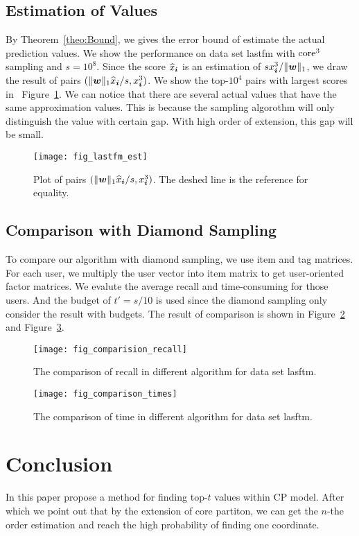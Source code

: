 \documentclass[letterpaper]{article}
\newcommand{\V}[1]{{\boldsymbol{{\MakeLowercase{#1}}}}}
\newcommand{\norm}[2]{\|#1\|_{#2}}
\newcommand{\Fig}[1]   {Figure~\ref{fig:#1}}
\newcommand{\Theo}[1] {Theorem~\ref{theo:#1}}
\begin{document}
\subsection{Estimation of Values}
By \Theo{Bound}, we gives the error bound of estimate the actual prediction values.
We show the performance on data set lastfm with ${\rm core}^3$ sampling and $s=10^8$.
Since the score $\widehat{x}_{\V{i}}$ is an estimation of $sx^3_{\V{i}}/\norm{\V{w}}{1}$,
we draw the result of pairs $(\norm{\V{w}}{1}\widehat{x}_{\V{i}}/s,x^3_{\V{i}})$.
We show the top-$10^4$ pairs with largest scores in ~\Fig{Est}.
We can notice that there are several actual values that have the same approximation values.
This is because the sampling algorothm will only distinguish the value with certain gap.
With high order of extension, this gap will be small. 
\begin{figure}[ht]
  \centering
  \texttt{[image: fig\_lastfm\_est]}\\
  \caption{Plot of pairs $(\norm{\V{w}}{1}\widehat{x}_{\V{i}}/s,x^3_{\V{i}})$.
          The deshed line is the reference for equality.}
  \label{fig:Est}
\end{figure}
\subsection{Comparison with Diamond Sampling}
To compare our algorithm with diamond sampling, we use item and tag matrices.
For each user, we multiply the user vector into item matrix
to get user-oriented factor matrices.
We evalute the average recall and time-consuming for those users.
And the budget of $t'=s/10$ is used since the diamond sampling only consider the result with budgets.
The result of comparison is shown in \Fig{Comparison_recall} and \Fig{Comparison_time}.

\begin{figure}[ht]
  \centering
  \texttt{[image: fig\_comparision\_recall]}\\
  \caption{The comparison of recall in different algorithm for data set lasftm.}
  \label{fig:Comparison_recall}
\end{figure}

\begin{figure}[ht]
    \centering
    \texttt{[image: fig\_comparison\_times]}\\
    \caption{The comparison of time in different algorithm for data set lasftm.}
\label{fig:Comparison_time}
\end{figure}

\section{Conclusion}
In this paper propose a method for finding top-$t$ values within CP model.
After which we point out that by the extension of core partiton, 
we can get the $n$-the order estimation and reach the high probability of finding one coordinate.


\end{document}
